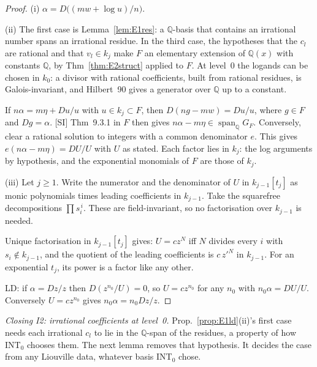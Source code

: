 \documentclass[11pt]{article}
\theoremstyle{definition}
\theoremstyle{remark}
\newcommand{\Q}{\mathbb{Q}}
\begin{document}
\begin{proof}
(i) $\alpha=D\bigl((mw+\log u)/n\bigr)$.

(ii) The first case is Lemma~\ref{lem:E1res}: a $\Q$-basis that contains an irrational number
spans an irrational residue. In the third case, the hypotheses that the $c_l$ are rational and
that $v_l\in k_j$ make $F$ an elementary extension of $\Q(x)$ with constants $\Q$, by
Thm~\ref{thm:E2struct} applied to $F$. At level~0 the logands can be chosen in $k_0$: a
divisor with rational coefficients, built from rational residues, is Galois-invariant, and
Hilbert~90 gives a generator over $\Q$ up to a constant.

If $n\alpha=m\eta+Du/u$ with $u\in k_j\subset F$, then $D(ng-mw)=Du/u$, where $g\in F$ and
$Dg=\alpha$. [SI] Thm~9.3.1 in $F$ then gives $n\alpha-m\eta\in\operatorname{span}_\Q G_F$.
Conversely, clear a rational solution to integers with a common denominator $e$. This gives
$e(n\alpha-m\eta)=DU/U$ with $U$ as stated. Each factor lies in $k_j$: the log arguments by
hypothesis, and the exponential monomials of $F$ are those of $k_j$.

(iii) Let $j\ge1$. Write the numerator and the denominator of $U$ in $k_{j-1}[t_j]$ as monic
polynomials times leading coefficients in $k_{j-1}$. Take the squarefree decompositions
$\prod s_i^{\,i}$. These are field-invariant, so no factorisation over $k_{j-1}$ is needed.

Unique factorisation in $k_{j-1}[t_j]$ gives: $U=cz^N$ iff $N$ divides every $i$ with
$s_i\notin k_{j-1}$, and the quotient of the leading coefficients is $c\,z'^N$ in $k_{j-1}$.
For an exponential $t_j$, its power is a factor like any other.

LD: if $\alpha=Dz/z$ then $D(z^{n_0}/U)=0$, so $U=cz^{n_0}$ for any $n_0$ with
$n_0\alpha=DU/U$. Conversely $U=cz^{n_0}$ gives $n_0\alpha=n_0Dz/z$.
\end{proof}

\noindent \emph{Closing I2: irrational coefficients at level~0.} Prop.~\ref{prop:E1ld}(ii)'s
first case needs each irrational $c_l$ to lie in the $\Q$-span of the residues, a property of
how INT$_0$ chooses them. The next lemma removes that hypothesis. It decides the case from any
Liouville data, whatever basis INT$_0$ chose.
\end{document}
